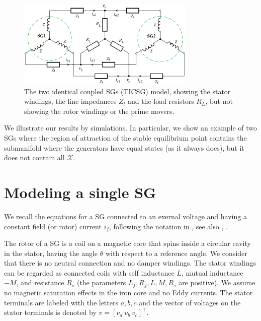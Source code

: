 \documentclass{ifacconf}
\newcommand{\Xmscr}  {{\mathcal{X}}}
\begin{document}
\begin{figure} %
\centering \includegraphics[width=8.5cm]{full_circuit_with_2_SGs}
\caption{The two identical coupled SGs (TICSG) model, showing the 
stator windings, the line impedances $Z_l$ and the load resistors 
$R_L$, but not showing the rotor windings or the prime movers.}
\label{fig:TICSGThreePhase}
\end{figure}

We illustrate our results by simulations. In particular, we show an
example of two SGs where the region of attraction of the stable
equilibrium point contains the submanifold where the generators have
equal states (as it always does), but it does not contain all
$\Xmscr$.

\section{Modeling a single SG} \label{sec2} %

We recall the equations for a SG connected to an exernal voltage and
having a constant field (or rotor) current $i_f$, following the
notation in \cite{ZhWe:11}, see also \cite{NaWe:14,NaWe:15},
\cite{VeWe:16}.

The rotor of a SG is a coil on a magnetic core that spins inside a
circular cavity in the stator, having the angle $\theta$ with respect
to a reference angle. We consider that there is no neutral
connection and no damper windings. The stator windings can be regarded
as connected coils with self inductance $L$, mutual inductance $-M$,
and resistance $R_s$ (the parameters $L_f,R_f,L,M,R_s$ are
positive). We assume no magnetic saturation effects in the iron core
and no Eddy currents. The stator terminals are labeled with the
letters $a,b,c$ and the vector of voltages on the stator terminals is
denoted by $v=\left[v_a\ v_b\ v_c\right]^\top$. 
\end{document}
